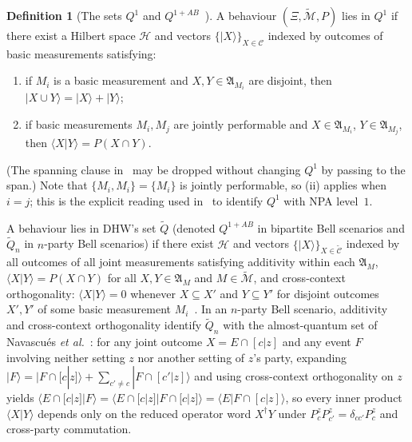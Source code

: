 \documentclass[11pt,a4paper]{article}
\theoremstyle{definition}
\newtheorem{definition}[theorem]{Definition}
\theoremstyle{remark}
\newcommand{\HH}{\mathcal{H}}
\newcommand{\tcM}{\widetilde{\mathcal{M}}}
\newcommand{\cC}{\mathcal{C}}
\newcommand{\tcC}{\widetilde{\mathcal{C}}}
\newcommand{\EA}{\mathfrak{A}}
\newcommand{\Qone}{Q^{1}}
\newcommand{\QAB}{Q^{1+AB}}
\newcommand{\tQ}{\widetilde{Q}}
\newcommand{\ket}[1]{|#1\rangle}
\newcommand{\braket}[2]{\langle #1 | #2 \rangle}
\begin{document}
\begin{definition}[The sets $\Qone$ and $\QAB$~\cite{DHW2014}]
\label{def:q1-qab}
A behaviour $(\Xi, \tcM, P)$ lies in $\Qone$ if there exist a Hilbert space $\HH$ and vectors $\{\ket{X}\}_{X \in \cC}$ indexed by outcomes of basic measurements satisfying:
\begin{enumerate}[label=(\roman*),nosep]
\item if $M_i$ is a basic measurement and $X, Y \in \EA_{M_i}$ are disjoint, then $\ket{X \cup Y} = \ket{X} + \ket{Y}$;
\item if basic measurements $M_i, M_j$ are jointly performable and $X \in \EA_{M_i}$, $Y \in \EA_{M_j}$, then $\braket{X}{Y} = P(X \cap Y)$.
\end{enumerate}
(The spanning clause in~\cite[Def.~4]{DHW2014} may be dropped without changing $\Qone$ by passing to the span.) Note that $\{M_i, M_i\} = \{M_i\}$ is jointly performable, so (ii) applies when $i = j$; this is the explicit reading used in~\cite[Sec.~7, Def.~22 and Lem.~23]{DHW2014} to identify $\Qone$ with NPA level~$1$.

A behaviour lies in DHW's set $\tQ$ (denoted $\QAB$ in bipartite Bell scenarios and $\tQ_n$ in $n$-party Bell scenarios) if there exist $\HH$ and vectors $\{\ket{X}\}_{X \in \tcC}$ indexed by all outcomes of all joint measurements satisfying additivity within each $\EA_M$, $\braket{X}{Y} = P(X \cap Y)$ for all $X, Y \in \EA_M$ and $M \in \tcM$, and cross-context orthogonality: $\braket{X}{Y} = 0$ whenever $X \subseteq X'$ and $Y \subseteq Y'$ for disjoint outcomes $X', Y'$ of some basic measurement $M_i$~\cite[Def.~5, Lem.~17]{DHW2014}. In an $n$-party Bell scenario, additivity and cross-context orthogonality identify $\tQ_n$ with the almost-quantum set of Navascu\'es \emph{et al.}~\cite{Navascues2015}: for any joint outcome $X = E \cap [c|z]$ and any event $F$ involving neither setting $z$ nor another setting of $z$'s party, expanding $\ket{F} = \ket{F \cap [c|z]} + \sum_{c' \neq c}\ket{F \cap [c'|z]}$ and using cross-context orthogonality on $z$ yields $\braket{E \cap [c|z]}{F} = \braket{E \cap [c|z]}{F \cap [c|z]} = \braket{E}{F \cap [c|z]}$, so every inner product $\braket{X}{Y}$ depends only on the reduced operator word $X^\dagger Y$ under $P^z_c P^z_{c'} = \delta_{cc'} P^z_c$ and cross-party commutation.
\end{definition}
\end{document}
